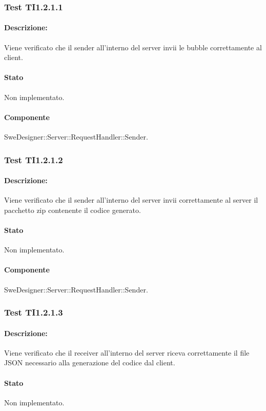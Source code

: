 \documentclass[../PianoDiQualifica.tex]{subfiles}
\begin{document}
	\subsubsection{Test TI1.2.1.1}
	\paragraph{Descrizione:} Viene verificato che il sender all'interno del server invii le bubble correttamente al client.
	\paragraph{Stato} Non implementato.
	\paragraph{Componente} SweDesigner::Server::RequestHandler::Sender.
	
	\subsubsection{Test TI1.2.1.2}
	\paragraph{Descrizione:} Viene verificato che il sender all'interno del server invii  correttamente al server il pacchetto zip contenente il codice generato.
	\paragraph{Stato} Non implementato.
	\paragraph{Componente} SweDesigner::Server::RequestHandler::Sender.
	\subsubsection{Test TI1.2.1.3}
	\paragraph{Descrizione:} Viene verificato che il receiver all'interno del server riceva correttamente il file JSON necessario alla generazione del codice dal client.
	\paragraph{Stato} Non implementato.
\end{document}
